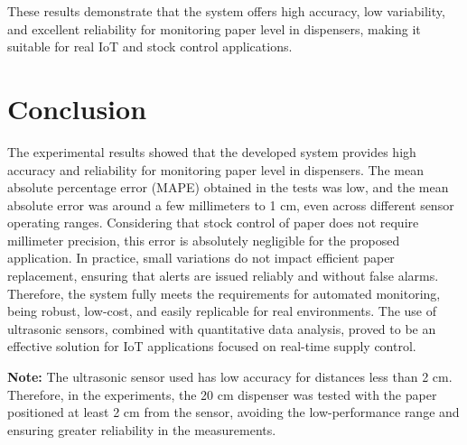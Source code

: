 \documentclass[english,hidelinks]{sbrt}
\begin{document}
These results demonstrate that the system offers high accuracy, low variability, and excellent reliability for monitoring paper level in dispensers, making it suitable for real IoT and stock control applications.

\section{Conclusion}
The experimental results showed that the developed system provides high accuracy and reliability for monitoring paper level in dispensers. The mean absolute percentage error (MAPE) obtained in the tests was low, and the mean absolute error was around a few millimeters to 1 cm, even across different sensor operating ranges. Considering that stock control of paper does not require millimeter precision, this error is absolutely negligible for the proposed application. In practice, small variations do not impact efficient paper replacement, ensuring that alerts are issued reliably and without false alarms. Therefore, the system fully meets the requirements for automated monitoring, being robust, low-cost, and easily replicable for real environments. The use of ultrasonic sensors, combined with quantitative data analysis, proved to be an effective solution for IoT applications focused on real-time supply control.

\textbf{Note:} The ultrasonic sensor used has low accuracy for distances less than 2 cm. Therefore, in the experiments, the 20 cm dispenser was tested with the paper positioned at least 2 cm from the sensor, avoiding the low-performance range and ensuring greater reliability in the measurements.


\end{document}
